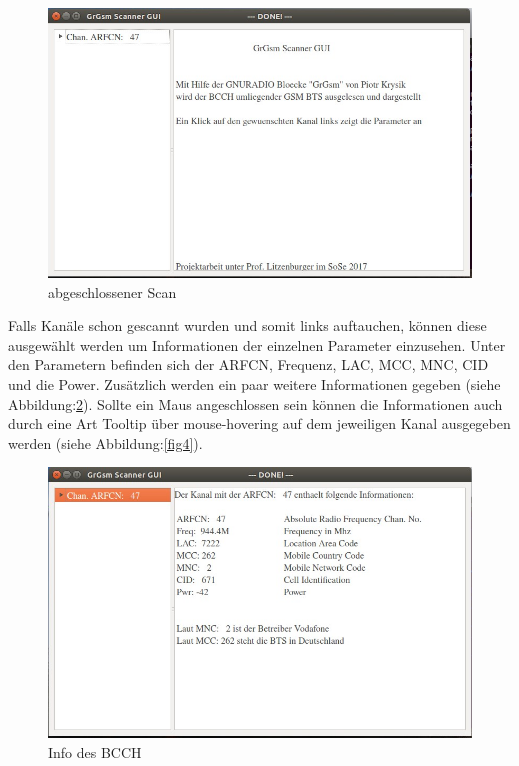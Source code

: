 \begin{figure}[H]
\centering
\includegraphics[scale=0.5]{GUI_Done}
\caption{abgeschlossener Scan}
\label{fig2}
\end{figure}

\noindent Falls Kanäle schon gescannt wurden und somit links auftauchen, können diese ausgewählt werden um Informationen der einzelnen Parameter einzusehen.
Unter den Parametern befinden sich der ARFCN, Frequenz, LAC, MCC, MNC, CID und die Power.
Zusätzlich werden ein paar weitere Informationen gegeben (siehe Abbildung:\ref{fig3}).
Sollte ein Maus angeschlossen sein können die Informationen auch durch eine Art Tooltip über mouse-hovering auf dem jeweiligen Kanal ausgegeben werden (siehe Abbildung:\ref{fig4}).

\begin{figure}[H]
\centering
\includegraphics[scale=0.5]{GUI_Textinfo}
\caption{Info des BCCH}
\label{fig3}
\end{figure}

